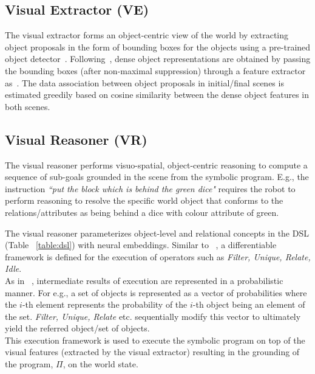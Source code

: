 
\subsection{Visual Extractor (VE)}
\label{subsec:visual-reason}
The visual extractor forms an object-centric view of the world by extracting object proposals in the form of bounding boxes for the objects using a pre-trained object detector~\cite{redmon2016you}. 
%
Following~\cite{Mao2019NeuroSymbolic}, dense object representations are obtained by passing the bounding boxes (after non-maximal suppression) through a feature extractor as~\cite{targ2016resnet}. 
The data association between object proposals in initial/final scenes is estimated greedily based on cosine similarity between the dense object features in both scenes.

\subsection{Visual Reasoner (VR)}
%
The visual reasoner performs visuo-spatial, object-centric reasoning to compute a sequence of sub-goals grounded in the scene from the symbolic program.
%
E.g., the instruction \textit{``put the block which is behind the green dice"} requires the robot to perform reasoning to resolve the specific world object that conforms to the relations/attributes as being behind a dice with colour attribute of green. 

The visual reasoner parameterizes object-level and relational concepts in the DSL (Table ~\ref{table:dsl}) with neural embeddings. Similar to ~\cite{Mao2019NeuroSymbolic}, a differentiable framework is defined for the execution of operators such as \emph{Filter, Unique, Relate, Idle}.  \\ 
%
As in ~\cite{Mao2019NeuroSymbolic}, intermediate results of execution are represented in a probabilistic manner. For e.g., a set of objects is represented as a vector of probabilities where the $i$-th element represents the probability of the $i$-th object being an element of the set. \emph{Filter, Unique, Relate} etc. sequentially modify this vector to ultimately yield the referred object/set of objects.  \\ 
%
This execution framework is used to execute the symbolic program  on top of the visual features (extracted by the visual extractor) resulting in the grounding of the program, $\Pi$, on the world state.


